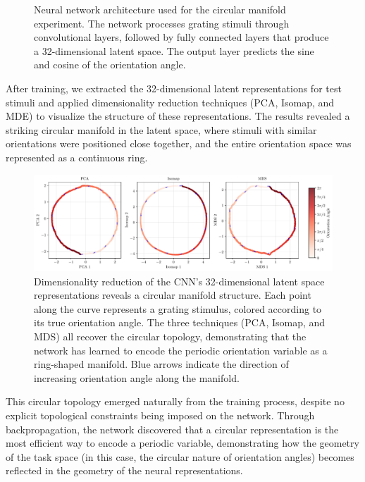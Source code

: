 \documentclass[11pt,a4paper]{article}
\begin{document}
\begin{figure}[h]
\begin{tikzpicture}

    \end{tikzpicture}
    \caption{Neural network architecture used for the circular manifold experiment. The network processes grating stimuli through convolutional layers, followed by fully connected layers that produce a 32-dimensional latent space. The output layer predicts the sine and cosine of the orientation angle.}
\end{figure}

After training, we extracted the 32-dimensional latent representations for test stimuli and applied dimensionality reduction techniques (PCA, Isomap, and MDE) to visualize the structure of these representations. The results revealed a striking circular manifold in the latent space, where stimuli with similar orientations were positioned close together, and the entire orientation space was represented as a continuous ring.

\begin{figure}[h]
    \centering
        \centering
        \includegraphics[width=\linewidth]{results/dim_reduction_combined.pdf}
        \caption{Dimensionality reduction of the CNN's 32-dimensional latent space representations reveals a circular manifold structure. Each point along the curve represents a grating stimulus, colored according to its true orientation angle. The three techniques (PCA, Isomap, and MDS) all recover the circular topology, demonstrating that the network has learned to encode the periodic orientation variable as a ring-shaped manifold. Blue arrows indicate the direction of increasing orientation angle along the manifold.}
    \label{fig:pca_latent_space}
\end{figure}

This circular topology emerged naturally from the training process, despite no explicit topological constraints being imposed on the network. Through backpropagation, the network discovered that a circular representation is the most efficient way to encode a periodic variable, demonstrating how the geometry of the task space (in this case, the circular nature of orientation angles) becomes reflected in the geometry of the neural representations.
\end{document}
